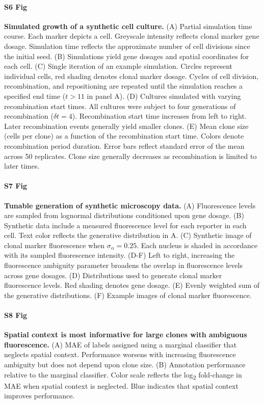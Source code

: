 \documentclass[10pt,letterpaper]{article}
\begin{document}
\paragraph*{S6 Fig}
\label{S6_Fig}
{\bf Simulated growth of a synthetic cell culture.} (A) Partial simulation time course. Each marker depicts a cell. Greyscale intensity reflects clonal marker gene dosage. Simulation time reflects the approximate number of cell divisions since the initial seed. (B) Simulations yield gene dosages and spatial coordinates for each cell. (C) Single iteration of an example simulation. Circles represent individual cells, red shading denotes clonal marker dosage. Cycles of cell division, recombination, and repositioning are repeated until the simulation reaches a specified end time ($t>11$ in panel A). (D) Cultures simulated with varying recombination start times. All cultures were subject to four generations of recombination ($\delta t=4$). Recombination start time increases from left to right. Later recombination events generally yield smaller clones. (E) Mean clone size (cells per clone) as a function of the recombination start time. Colors denote recombination period duration. Error bars reflect standard error of the mean across 50 replicates. Clone size generally decreases as recombination is limited to later times.

\paragraph*{S7 Fig}
\label{S7_Fig}
{\bf Tunable generation of synthetic microscopy data.} (A) Fluorescence levels are sampled from lognormal distributions conditioned upon gene dosage. (B) Synthetic data include a measured fluorescence level for each reporter in each cell. Text color reflects the generative distribution in A. (C) Synthetic image of clonal marker fluorescence when $\sigma_{\alpha}=0.25$. Each nucleus is shaded in accordance with its sampled fluorescence intensity. (D-F) Left to right, increasing the fluorescence ambiguity parameter broadens the overlap in fluorescence levels across gene dosages. (D) Distributions used to generate clonal marker fluorescence levels. Red shading denotes gene dosage. (E) Evenly weighted sum of the generative distributions. (F) Example images of clonal marker fluorescence.

\paragraph*{S8 Fig}
\label{S8_Fig}
{\bf Spatial context is most informative for large clones with ambiguous fluorescence.} (A) MAE of labels assigned using a marginal classifier that neglects spatial context. Performance worsens with increasing fluorescence ambiguity but does not depend upon clone size. (B) Annotation performance relative to the marginal classifier. Color scale reflects the log\textsubscript{2} fold-change in MAE when spatial context is neglected. Blue indicates that spatial context improves performance.
\end{document}
